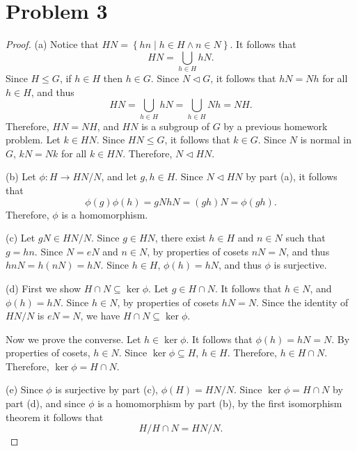 \documentclass[11pt, letterpaper]{report}
\begin{document}
\section*{Problem 3}
\begin{proof}
	(a) Notice that $HN = \left\{ hn \mid h\in H\land n\in N \right\} $. It follows that
	\[
		HN=\bigcup_{h\in H}hN
	.\]
	Since $H\leq G$, if $h\in H$ then $h\in G$. Since $N\triangleleft G$, it follows that $hN=Nh$ for all $h\in H$, and thus
	\[
		HN=\bigcup_{h\in H}hN=\bigcup_{h\in H}Nh=NH
	.\]
	Therefore, $HN=NH$, and $HN$ is a subgroup of $G$ by a previous homework problem. Let $k\in HN$. Since $HN\leq G$, it follows that $k\in G$. Since $N$ is normal in $G$, $kN=Nk$ for all $k\in HN$. Therefore, $N\triangleleft HN$.

	(b) Let $\phi : H \to HN /N$, and let $g,h\in H$. Since $N\triangleleft HN$ by part (a), it follows that
	\[
		\phi (g)\phi (h)=gNhN=(gh)N=\phi (gh)
	.\]
	Therefore, $\phi $ is a homomorphism.

	(c) Let $gN\in HN /N$.  Since $g\in HN$, there exist $h\in H$ and $n\in N$ such that $g=hn$. Since $N=eN$ and $n\in N$, by properties of cosets $nN=N$, and thus $hnN=h(nN)=hN$. Since $h\in H$, $\phi (h)=hN$, and thus $\phi $ is surjective.

	(d) First we show $H\cap N\subseteq \ker \phi $. Let $g\in H\cap N$. It follows that $h\in N$, and $\phi (h)=hN$. Since $h\in N$, by properties of cosets $hN=N$. Since the identity of $HN /N$ is $eN=N$, we have $H\cap N \subseteq \ker \phi $.

	Now we prove the converse. Let $h\in \ker \phi $. It follows that $\phi (h)=hN=N$. By properties of cosets, $h\in N$. Since $\ker \phi \subseteq H$, $h\in H$. Therefore, $h\in H\cap N$. Therefore, $\ker \phi =H\cap N$.

	(e) Since $\phi $ is surjective by part (c), $\phi (H)=HN /N$. Since $\ker \phi =H\cap N$ by part (d), and since $\phi $ is a homomorphism by part (b), by the first isomorphism theorem it follows that
	\[
		H /H\cap N = HN /N
	.\]
\end{proof}
\end{document}
